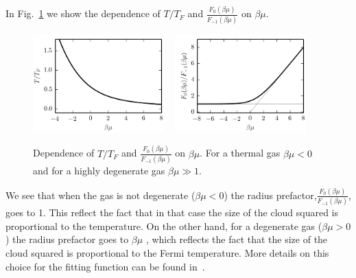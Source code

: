 In Fig.~\ref{fig:betamu} we show the dependence of $T/T_{F}$ and
$\frac{F_{0}(\beta\mu)}{F_{-1}(\beta\mu)}$ on $\beta\mu$.  
\begin{figure}
\centering
\includegraphics[width=0.45\textwidth]{../figures/fermi-thermometry/tf.png}
~\centering
\includegraphics[width=0.45\textwidth]{../figures/fermi-thermometry/fq.png}
\caption[Dependence on $\beta\mu$]{Dependence of $T/T_{F}$ and
$\frac{F_{0}(\beta\mu)}{F_{-1}(\beta\mu)}$ on $\beta\mu$.   For a thermal gas
$\beta\mu<0$ and for a highly degenerate gas $\beta\mu \gg 1 $. }
\label{fig:betamu}
\end{figure}
We see that when the gas is not degenerate ($\beta\mu < 0$) the radius
prefactor,$\frac{F_{0}(\beta\mu)}{F_{-1}(\beta\mu)}$, goes to 1.  This reflect
the fact that in that case the size of the cloud squared is proportional to the
temperature.   On the other hand, for a degenerate gas ($\beta\mu > 0$) the
radius prefactor goes to $\beta\mu$ , which reflects the fact that the size of
the cloud squared is proportional to the Fermi temperature.  More details on
this choice for the fitting function can be found in~\cite{Making2007}.  



